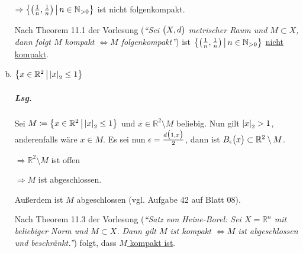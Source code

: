 \documentclass{scrreprt}
\begin{document}
\begin{enumerate}[(a)]
  $\Rightarrow
  \qty{\qty(\frac{1}{n}, \frac{1}{n}) \,\middle |\, n \in \mathbb{N}_{> 0}}$
  ist nicht folgenkompakt.

  Nach Theorem 11.1 der Vorlesung (\emph{``Sei $\qty\big(X, d)$ metrischer Raum
    und $M \subset X$, dann folgt $M$ kompakt $\iff M$ folgenkompakt''})
  ist $\qty{\qty(\frac{1}{n}, \frac{1}{n}) \,\middle |\, n \in \mathbb{N}_{> 0}}$
  \underline{nicht kompakt}.

\item $\qty\big{x \in \mathbb{R}^2 \,{\big |}\, \abs{x}_2 \leq 1}$

  \subparagraph{Lsg.} Sei $M \coloneqq
  \qty\big{x \in \mathbb{R}^2 \,{\big |}\, \abs{x}_2 \leq 1}$ und
  $x \in \mathbb{R}^2 \setminus M$ beliebig.
  Nun gilt $\abs{x}_2 > 1$, anderenfalls wäre $x \in M$.
  Es sei nun $\epsilon = \frac{d\qty\big(1, x)}{2}$, dann ist
  $B_{\epsilon}\qty\big(x) \subset \mathbb{R}^2 \setminus M$.

  $\Rightarrow \mathbb{R}^2 \setminus M$ ist offen

  $\Rightarrow M$ ist abgeschlossen.

  Außerdem ist $M$ abgeschlossen (vgl. Aufgabe 42 auf Blatt 08).

  Nach Theorem 11.3 der Vorlesung (\emph{``Satz von Heine-Borel: Sei
    $X = \mathbb{R}^n$ mit beliebiger Norm und $M \subset X$.
    Dann gilt $M$ ist kompakt $\iff M$ ist abgeschlossen und beschränkt.''})
  folgt, dass \underline{$M$ kompakt ist}.
\end{enumerate}
\end{document}
